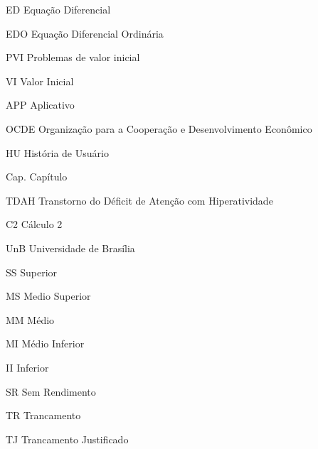 \begin{siglas}
  \item[ED] Equação Diferencial
  \item[EDO] Equação Diferencial Ordinária
  \item[PVI] Problemas de valor inicial
  \item[VI] Valor Inicial
  \item[APP] Aplicativo
  \item[OCDE] Organização para a Cooperação e Desenvolvimento Econômico
  \item[HU] História de Usuário
  \item[Cap.] Capítulo
  \item[TDAH] Transtorno do Déficit de Atenção com Hiperatividade 
  \item[C2] Cálculo 2
  \item[UnB] Universidade de Brasília
  \item[SS] Superior  
  \item[MS] Medio Superior
  \item[MM] Médio 
  \item[MI] Médio Inferior
  \item[II] Inferior  
  \item[SR] Sem Rendimento 
  \item[TR] Trancamento
  \item[TJ] Trancamento Justificado 
\end{siglas}
